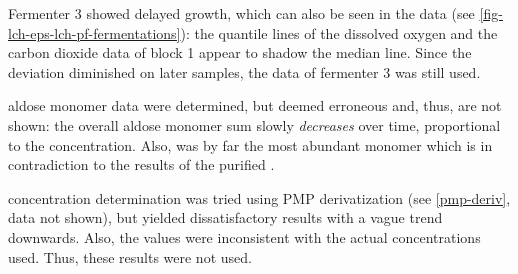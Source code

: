 Fermenter 3 showed delayed growth, which can also be seen in the data (see \vref{fig-lch-eps-lch-pf-fermentations}): the quantile lines of the dissolved oxygen and the carbon dioxide data of block 1 appear to shadow the median line. Since the deviation diminished on later samples, the data of fermenter 3 was still used.

\EPS{} aldose monomer data were determined, but deemed erroneous and, thus, are not shown: the overall aldose monomer sum slowly \textit{decreases} over time, proportional to the \glc{} concentration. Also, \glc{} was by far the most abundant monomer which is in contradiction to the results of the purified \eps{}.

\XYL{} concentration determination was tried using PMP derivatization (see \vref{pmp-deriv}, data not shown), but yielded dissatisfactory results with a vague trend downwards. Also, the values were inconsistent with the actual concentrations used. Thus, these results were not used.

